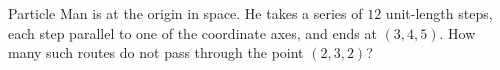 Particle Man is at the origin in space. He takes a series of $12$ unit-length steps, each step parallel to one of the coordinate axes, and ends at $(3,4,5)$. How many such routes do not pass through the point $(2,3,2)$?
